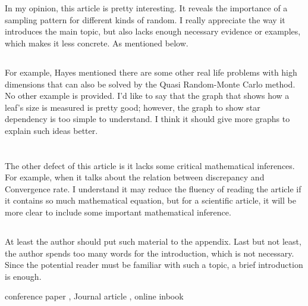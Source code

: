 \documentclass[10pt]{article}
\begin{document}
\section{}

\subsection{} 
\par In my opinion, this article is pretty interesting. It reveals the importance of a sampling pattern for different kinds of random. I really appreciate the way it introduces the main topic, but also lacks enough necessary evidence or examples, which makes it less concrete. As mentioned below. 

\subsection{} \label{section_ref}
\par For example, Hayes mentioned there are some other real life problems with high dimensions that can also be solved by the Quasi Random-Monte Carlo method. No other example is provided. I’d like to say that the graph that shows how a leaf’s size is measured is pretty good; however, the graph to show star dependency is too simple to understand. I think it should give more graphs to explain such ideas better.

\section{}

\subsection{}
\par The other defect of this article is it lacks some critical mathematical inferences. For example, when it talks about the relation between discrepancy and Convergence rate. I understand it may reduce the fluency of reading the article if it contains so much mathematical equation, but for a scientific article, it will be more clear to include some important mathematical inference. 



\subsection{}
\par At least the author should put such material to the appendix. Last but not least, the author spends too many words for the introduction, which is not necessary. Since the potential reader must be familiar with such a topic, a brief introduction is enough.

\par
conference paper \cite{proc-disc-2009},
Journal article \cite{Abril:2007:PHD:1188913.1188915},
online \cite{knuthwebsite}
inbook \cite{knuth-fa}






\end{document}
